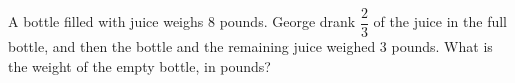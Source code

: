 A bottle filled with juice weighs $8$ pounds. George drank $\dfrac{2}{3}$ of the juice in the full bottle, and then the bottle and the remaining juice weighed $3$ pounds. What is the weight of the empty bottle, in pounds?

